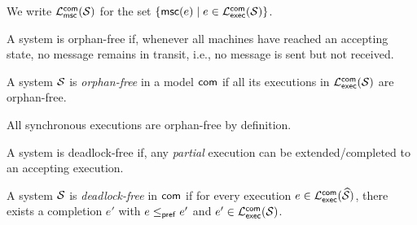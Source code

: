 
We write $\mathcal{L}_{\mathsf{msc}}^{\mathsf{com}}(\mathcal{S})$ for the set 
$\{\mathsf{msc}(e) \mid e\in\mathcal{L}_{\mathsf{exec}}^{\mathsf{com}}(\mathcal{S})\}$.

A system is orphan-free if, whenever all machines have reached 
an accepting state, no message
remains in transit, i.e., no message is sent but not received.

\bigskip

\begin{definition}\label{def:orphan-free}
A system $\mathcal{S}$ is \emph{orphan-free} in a model $\mathsf{com}$  
if all its executions in $\mathcal{L}_{\mathsf{exec}}^{\mathsf{com}}(\mathcal{S})$  
are orphan-free.  
\end{definition}

All synchronous executions are orphan-free by definition.

A system is deadlock-free if, 
any \emph{partial} execution can be extended/completed to an accepting execution.

\bigskip

\begin{definition}\label{def:deadlock-free}
A system $\mathcal{S}$ is \emph{deadlock-free} in $\mathsf{com}$  
if for every execution 
$e \in \mathcal{L}_{\mathsf{exec}}^{\mathsf{com}}(\widehat{\mathcal{S}})$,  
there exists a completion $e'$ with $e \mathrel{\leq_{\mathsf{pref}}} e'$ and  
$e' \in \mathcal{L}_{\mathsf{exec}}^{\mathsf{com}}(\mathcal{S})$.  
\end{definition}


